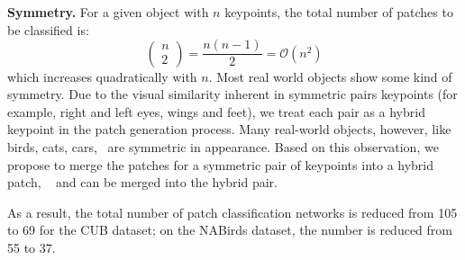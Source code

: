 \noindent\textbf{Symmetry.} 
For a given object with $n$ keypoints, the total number of patches to be classified is:
$$ \begin{pmatrix} n \\ 2  \end{pmatrix} = \frac{n(n-1)}{2} = \mathcal{O}(n^2)$$
which increases quadratically with $n$.
Most real world objects show some kind of symmetry. Due to the visual
similarity inherent in symmetric pairs keypoints (for example, right and left eyes, wings and feet), we treat
each pair as a hybrid keypoint in the patch generation process.  Many real-world objects, however, like birds, cats, cars, \etc~are symmetric in appearance.  Based on this observation, we propose to merge the patches for a symmetric pair of keypoints into a hybrid patch, \eg~ and  can be merged into the hybrid  pair.
\begin{comment}
We then train a separate CNN model for each hybrid patch.
We observe consistent patch accuracy increase after applying symmetry to the dataset, we believe this is caused by larger training set size.
Additionally, we also reduce the patch classifier number.
For example, in the CUB dataset, total classifiers are reduced from from 105 to 69.  For the NABirds dataset, total classifiers are reduced from 55 yo 37.
At inference stage, we apply hybrid patch model to each original patch, so we still have the full set of patch scores.
\end{comment}

As a result, the total number of patch classification networks is reduced from 105 to 69 for the CUB dataset; on the NABirds dataset, the number is reduced from 55 to 37.

